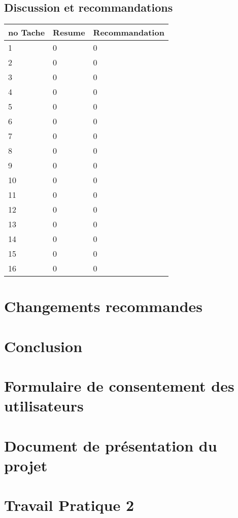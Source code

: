 \documentclass[letterpaper, oneside, 12pt, these, creativecommons]{thETS}
\begin{document}
\newpage

\section{Discussion et recommandations}

\begin{table}
	\centering
	\begin{tabular}{|l|l|l|}
	\hline
	no Tache	& Resume	& Recommandation 	\\ \hline
	1		& 0		& 0 			\\ \hline
	2		& 0		& 0 			\\ \hline
	3		& 0		& 0 			\\ \hline
	4		& 0		& 0 			\\ \hline
	5		& 0		& 0 			\\ \hline
	6		& 0		& 0 			\\ \hline
	7		& 0		& 0 			\\ \hline
	8		& 0		& 0 			\\ \hline
	9		& 0		& 0 			\\ \hline
	10		& 0		& 0 			\\ \hline
	11		& 0		& 0 			\\ \hline
	12		& 0		& 0 			\\ \hline
	13		& 0		& 0 			\\ \hline
	14		& 0		& 0 			\\ \hline
	15		& 0		& 0 			\\ \hline
	16		& 0		& 0 			\\ \hline
	\end{tabular}
\end{table}

\chapter{Changements recommandes}

\chapter{Conclusion}

\appendix
\multiannexe

\chapter{Formulaire de consentement des utilisateurs}



\chapter{Document de présentation du projet}



\chapter{Travail Pratique 2}


\end{document}
